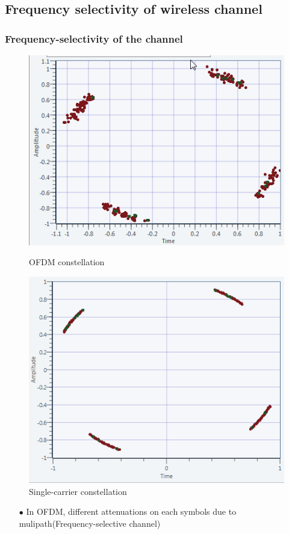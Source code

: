 \documentclass[11pt]{beamer}
\begin{document}
\subsection{Frequency selectivity of wireless channel}
\begin{frame}
\frametitle{Frequency-selectivity of the channel}

\begin{figure}[!ht]
    \begin{minipage}[b]{0.48\linewidth}
        \centering \includegraphics[scale=0.41]{img/multicarrier_200hz.png}
        \caption{OFDM constellation}
    \end{minipage}\hfill
    \begin{minipage}[b]{0.48\linewidth}
         \centering \includegraphics[scale=0.35]{img/SingleCarrier_Offset_200}
         \caption{Single-carrier constellation}
    \end{minipage}
\end{figure}

\begin{itemize}
\item[$\bullet$] In OFDM, different attenuations on each symbols due to mulipath(Frequency-selective channel)
\end{itemize}
\end{frame}
\end{document}
